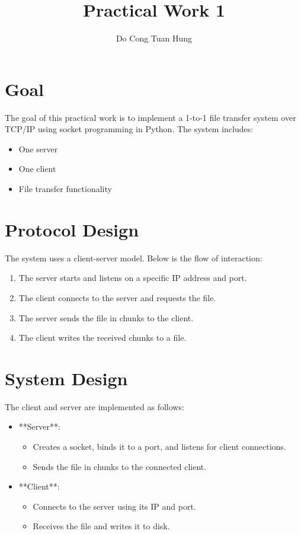\documentclass[a4paper,12pt]{article}
\title{Practical Work 1}
\author{Do Cong Tuan Hung}
\begin{document}
\maketitle

\section*{Goal}
The goal of this practical work is to implement a 1-to-1 file transfer system over TCP/IP using socket programming in Python. The system includes:
\begin{itemize}
    \item One server
    \item One client
    \item File transfer functionality
\end{itemize}

\section*{Protocol Design}
The system uses a client-server model. Below is the flow of interaction:
\begin{enumerate}
    \item The server starts and listens on a specific IP address and port.
    \item The client connects to the server and requests the file.
    \item The server sends the file in chunks to the client.
    \item The client writes the received chunks to a file.
\end{enumerate}

\section*{System Design}
The client and server are implemented as follows:
\begin{itemize}
    \item **Server**:
          \begin{itemize}
              \item Creates a socket, binds it to a port, and listens for client connections.
              \item Sends the file in chunks to the connected client.
          \end{itemize}
    \item **Client**:
          \begin{itemize}
              \item Connects to the server using its IP and port.
              \item Receives the file and writes it to disk.
          \end{itemize}
\end{itemize}
\end{document}
